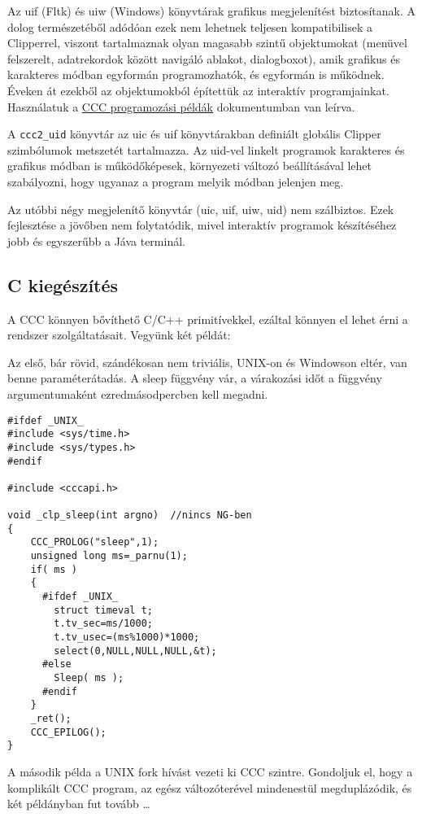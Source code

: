 Az uif (Fltk) és uiw (Windows) könyvtárak 
grafikus megjelenítést biztosítanak. A dolog természetéből
adódóan ezek  nem lehetnek teljesen kompatibilisek a Clipperrel,
viszont tartalmaznak olyan magasabb szintű objektumokat
(menüvel felszerelt, adatrekordok között navigáló ablakot, dialogboxot), 
amik grafikus és karakteres módban egyformán programozhatók, és egyformán 
is működnek. Éveken át ezekből az objektumokból építettük az interaktív
programjainkat. Használatuk a 
\href{cccapix.html}{CCC programozási példák} dokumentumban
van leírva.


A  \verb!ccc2_uid! könyvtár az  uic és  uif könyvtárakban 
definiált globális  Clipper szimbólumok metszetét tartalmazza.
Az uid-vel linkelt programok karakteres és grafikus módban is 
működőképesek, környezeti változó beállításával lehet 
szabályozni, hogy ugyanaz a program melyik módban jelenjen meg.

Az utóbbi négy megjelenítő könyvtár (uic, uif, uiw, uid) nem szálbiztos. 
Ezek fejlesztése a jövőben nem folytatódik, mivel interaktív
programok készítéséhez jobb és egyszerűbb a Jáva terminál. 


\subsection{C kiegészítés}

A CCC könnyen bővíthető C/C++ primitívekkel,
ezáltal könnyen el lehet érni a rendszer szolgáltatásait.
Vegyünk két példát:


Az első, bár rövid, szándékosan nem triviális,
UNIX-on és Windowson eltér, van benne paraméterátadás.
A sleep függvény vár, a várakozási időt
 a függvény argumentumaként ezredmásodpercben kell megadni. 
\begin{verbatim}
#ifdef _UNIX_
#include <sys/time.h>
#include <sys/types.h>
#endif

#include <cccapi.h>

void _clp_sleep(int argno)  //nincs NG-ben
{
    CCC_PROLOG("sleep",1);
    unsigned long ms=_parnu(1); 
    if( ms )
    {
      #ifdef _UNIX_
        struct timeval t;
        t.tv_sec=ms/1000;
        t.tv_usec=(ms%1000)*1000;
        select(0,NULL,NULL,NULL,&t);
      #else
        Sleep( ms );
      #endif
    }
    _ret();
    CCC_EPILOG();
}

\end{verbatim}

A második példa a UNIX fork hívást vezeti ki CCC szintre.
Gondoljuk el, hogy a komplikált CCC program, az egész változóterével
mindenestül megduplázódik, és két példányban fut tovább \ldots 

